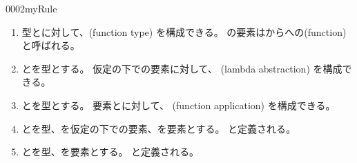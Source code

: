 \documentclass[index]{subfiles}
\begin{document}
\begin{myBlock}{0002}{myRule}
  \begin{enumerate}
  \item 型とに対して、(function type) を構成できる。
    の要素はからへの(function)と呼ばれる。
  \item {}とを型とする。
    仮定の下での要素に対して、
    (lambda abstraction) を構成できる。
  \item {}とを型とする。
    要素とに対して、
    (function application) を構成できる。
  \item {}とを型、を仮定の下での要素、を要素とする。
    と定義される。
  \item {}とを型、を要素とする。
    と定義される。
  \end{enumerate}
\end{myBlock}
\end{document}
